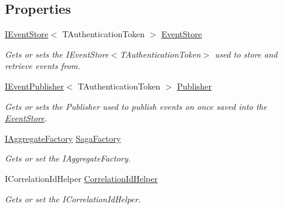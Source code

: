 \subsection*{Properties}
\begin{DoxyCompactItemize}
\item 
\hyperlink{interfaceCqrs_1_1Events_1_1IEventStore}{I\+Event\+Store}$<$ T\+Authentication\+Token $>$ \hyperlink{classCqrs_1_1Domain_1_1SagaRepository_a4b872f1a20660ece8ce1b54720193fda_a4b872f1a20660ece8ce1b54720193fda}{Event\+Store}
\begin{DoxyCompactList}\small\item\em Gets or sets the I\+Event\+Store$<$\+T\+Authentication\+Token$>$ used to store and retrieve events from. \end{DoxyCompactList}\item 
\hyperlink{interfaceCqrs_1_1Events_1_1IEventPublisher}{I\+Event\+Publisher}$<$ T\+Authentication\+Token $>$ \hyperlink{classCqrs_1_1Domain_1_1SagaRepository_a94707dc4549d096ea3cf5d241117495a_a94707dc4549d096ea3cf5d241117495a}{Publisher}
\begin{DoxyCompactList}\small\item\em Gets or sets the Publisher used to publish events on once saved into the \hyperlink{namespaceCqrs_1_1EventStore}{Event\+Store}. \end{DoxyCompactList}\item 
\hyperlink{interfaceCqrs_1_1Domain_1_1Factories_1_1IAggregateFactory}{I\+Aggregate\+Factory} \hyperlink{classCqrs_1_1Domain_1_1SagaRepository_a578164fa38728f3a23ca41d8c81611e0_a578164fa38728f3a23ca41d8c81611e0}{Saga\+Factory}
\begin{DoxyCompactList}\small\item\em Gets or set the I\+Aggregate\+Factory. \end{DoxyCompactList}\item 
I\+Correlation\+Id\+Helper \hyperlink{classCqrs_1_1Domain_1_1SagaRepository_a654f9f7c2130864d63515f1504a750fd_a654f9f7c2130864d63515f1504a750fd}{Correlation\+Id\+Helper}
\begin{DoxyCompactList}\small\item\em Gets or set the I\+Correlation\+Id\+Helper. \end{DoxyCompactList}\end{DoxyCompactItemize}


